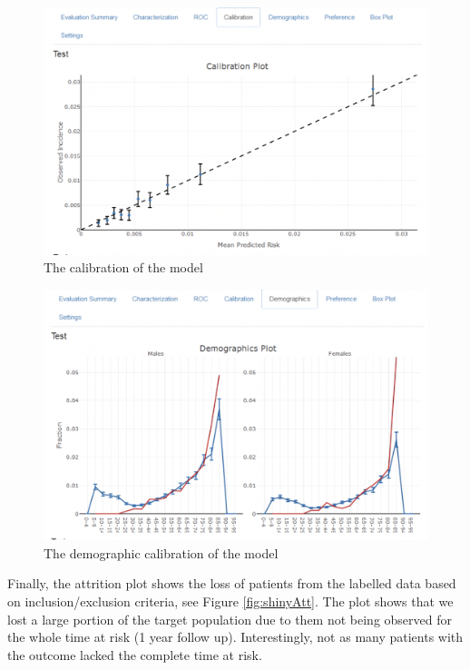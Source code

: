 \documentclass[11pt]{book}
\theoremstyle{definition}
\theoremstyle{definition}
\theoremstyle{definition}
\theoremstyle{remark}
\begin{document}
\begin{figure}

{\centering \includegraphics[width=1\linewidth]{images/PatientLevelPrediction/shiny/singleShiny/singleShinyCal} 

}

\caption{The calibration of the model}\label{fig:shinyCal}
\end{figure}

\begin{figure}

{\centering \includegraphics[width=1\linewidth]{images/PatientLevelPrediction/shiny/singleShiny/singleShinyDemo} 

}

\caption{The demographic calibration of the model}\label{fig:shinyDemo}
\end{figure}

Finally, the attrition plot shows the loss of patients from the labelled data based on inclusion/exclusion criteria, see Figure \ref{fig:shinyAtt}. The plot shows that we lost a large portion of the target population due to them not being observed for the whole time at risk (1 year follow up). Interestingly, not as many patients with the outcome lacked the complete time at risk.
\end{document}
